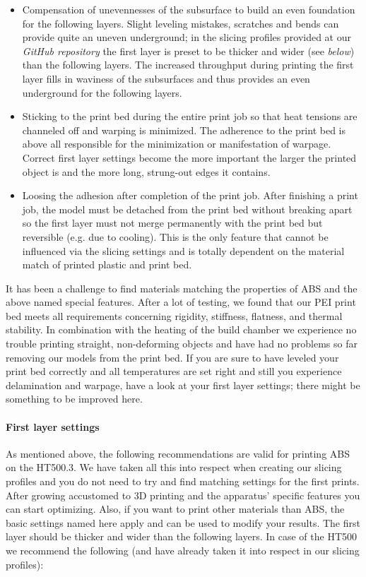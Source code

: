 \begin{itemize}
  \item Compensation of unevennesses of the subsurface to build an even foundation for the 
        following layers. Slight leveling mistakes, scratches and bends can provide quite an uneven underground; in the slicing profiles provided at our \emph{GitHub repository} the first layer is preset to be thicker and wider (see \emph{below}) than the following layers. The increased throughput during printing the first layer fills in waviness of the subsurfaces and thus provides an even underground for the following layers.
  \item Sticking to the print bed during the entire print job so that heat tensions are 
        channeled off and warping is minimized. The adherence to the print bed is above all responsible for the minimization or manifestation of warpage. Correct first layer settings become the more important the larger the printed object is and the more long, strung-out edges it contains.
  \item Loosing the adhesion after completion of the print job. After finishing a print job,
        the model must be detached from the print bed without breaking apart so the first layer must not merge permanently with the print bed but reversible (e.g. due to cooling). This is the only feature that cannot be influenced via the slicing settings and is totally dependent on the material match of printed plastic and print bed.
\end{itemize}

It has been a challenge to find materials matching the properties of ABS and the above named special features. After a lot of testing, we found that our PEI print bed meets all requirements concerning rigidity, stiffness, flatness, and thermal stability. In combination with the heating of the build chamber we experience no trouble printing straight, non-deforming objects and have had no problems so far removing our models from the print bed.
If you are sure to have leveled your print bed correctly and all temperatures are set right and still you experience delamination and warpage, have a look at your first layer settings; there might be something to be improved here. 


\paragraph{First layer settings}

As mentioned above, the following recommendations are valid for printing ABS on the HT500.3. We have taken all this into respect when creating our slicing profiles and you do not need to try and find matching settings for the first prints. After growing accustomed to 3D printing and the apparatus' specific features you can start optimizing. Also, if you want to print other materials than ABS, the basic settings named here apply and can be used to modify your results.
The first layer should be thicker and wider than the following layers. In case of the HT500 we recommend the following (and have already taken it into respect in our slicing profiles):

